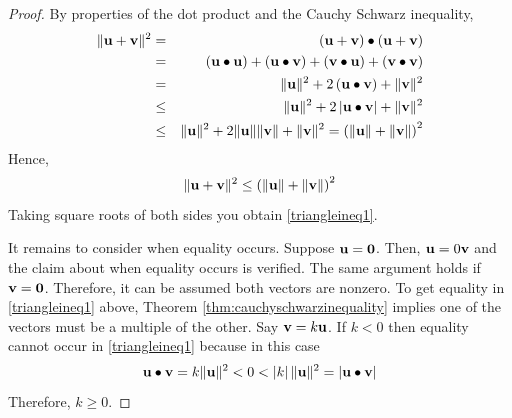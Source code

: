 \ifdefined\showproofs
\begin{proof} By properties of the dot product and the Cauchy Schwarz
inequality,
\begin{eqnarray*}
\| \mathbf{u}+\mathbf{v}\| ^{2} &=& \left( \mathbf{u}+\mathbf{v}\right) \bullet \left( \mathbf{u}+\mathbf{v}\right) \\
& =&\left( \mathbf{u}\bullet \mathbf{u}\right) +\left( \mathbf{u}\bullet \mathbf{v}\right) +\left(\mathbf{v}\bullet \mathbf{u}\right) +\left( \mathbf{v}\bullet \mathbf{v}\right) \\
&=&\| \mathbf{u}\| ^{2}+2\left( \mathbf{u}\bullet \mathbf{v}\right)+\| \mathbf{v}\| ^{2} \\
&\leq& \| \mathbf{u}\| ^{2}+2\left\vert \mathbf{u}\bullet \mathbf{v}\right\vert +\| \mathbf{v}\| ^{2} \\
&\leq& \| \mathbf{u}\| ^{2}+2\| \mathbf{u}\| \| \mathbf{v}\| +\| \mathbf{v}\| ^{2} =\left( \| \mathbf{u}\| +\| \mathbf{v}\|\right) ^{2}
\end{eqnarray*}
Hence,
\begin{equation*}
\| \mathbf{u}+\mathbf{v}\| ^{2} \leq \left( \| \mathbf{u}\| +\| \mathbf{v}\|
\right) ^{2}
\end{equation*}
Taking square roots of both sides you obtain \ref{triangleineq1}.

It remains to consider when equality occurs. Suppose $\mathbf{u} = \mathbf{0}$.
Then, $\mathbf{u} = 0 \mathbf{v}$ and the claim about when
equality occurs is verified. The same argument holds if $\mathbf{v} = \mathbf{0}$. 
 Therefore, it can be assumed both vectors are
nonzero. To get equality in \ref{triangleineq1} above, Theorem \ref{thm:cauchyschwarzinequality} 
implies one of the vectors must be a multiple of
the other. Say $\mathbf{v}= k \mathbf{u}$. If $k <0$ then equality
cannot occur in \ref{triangleineq1} because in this case
\begin{equation*}
\mathbf{u}\bullet \mathbf{v} =k \| \mathbf{u}\|
^{2}<0<\left| k \right| \| \mathbf{u}\| ^{2}=\left| \mathbf{u}\bullet \mathbf{v}\right|
\end{equation*}
Therefore, $k \geq 0.$


\end{proof}
